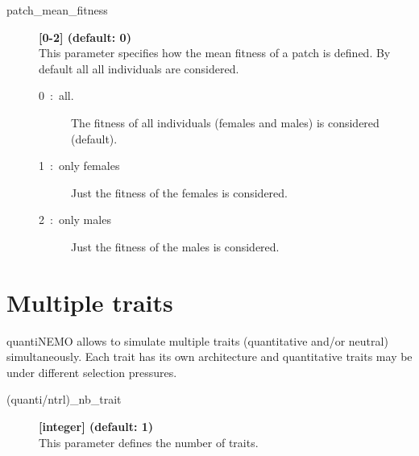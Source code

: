 \documentclass[letterpaper,12pt,oneside]{book}
\begin{document}
\begin{description}
\item[patch\_mean\_fitness] \textbf{[0-2] (default: 0)}\\
This parameter specifies how the mean fitness of a patch is defined. By default all all individuals are considered.
\begin{description}
\item [0~:~all.] The fitness of all individuals (females and males) is considered (default).
\item [1~:~only females] Just the fitness of the females is considered.
\item [2~:~only males] Just the fitness of the males is considered.
\end{description}

\end{description}
\section{Multiple traits}\label{sec:quantiMulti}
quantiNEMO allows to simulate multiple traits (quantitative and/or neutral) simultaneously. Each trait has its own architecture and quantitative traits may be under different selection pressures.

\begin{description}
\item[(quanti/ntrl)\_nb\_trait] \textbf{[integer] (default: 1)}\\
This parameter defines the number of traits.
\end{description}
\end{document}

